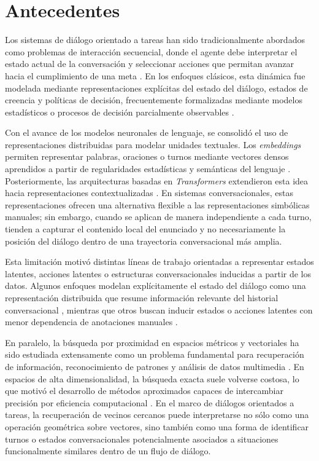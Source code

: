 \documentclass[runningheads]{llncs}
\begin{document}
\section{Antecedentes}
\label{sec:background}

Los sistemas de diálogo orientado a tareas han sido tradicionalmente abordados como problemas de interacción secuencial, donde el agente debe interpretar el estado actual de la conversación y seleccionar acciones que permitan avanzar hacia el cumplimiento de una meta \cite{young2013pomdp}. En los enfoques clásicos, esta dinámica fue modelada mediante representaciones explícitas del estado del diálogo, estados de creencia y políticas de decisión, frecuentemente formalizadas mediante modelos estadísticos o procesos de decisión parcialmente observables \cite{williams2013pomdp,chen2017survey}. 

Con el avance de los modelos neuronales de lenguaje, se consolidó el uso de representaciones distribuidas para modelar unidades textuales. Los \textit{embeddings} permiten representar palabras, oraciones o turnos mediante vectores densos aprendidos a partir de regularidades estadísticas y semánticas del lenguaje \cite{bengio2003neural,reimers2019sentencebert}. Posteriormente, las arquitecturas basadas en \textit{Transformers} extendieron esta idea hacia representaciones contextualizadas \cite{vaswani2017attention,devlin2019bert}. En sistemas conversacionales, estas representaciones ofrecen una alternativa flexible a las representaciones simbólicas manuales; sin embargo, cuando se aplican de manera independiente a cada turno, tienden a capturar el contenido local del enunciado y no necesariamente la posición del diálogo dentro de una trayectoria conversacional más amplia.

Esta limitación motivó distintas líneas de trabajo orientadas a representar estados latentes, acciones latentes o estructuras conversacionales inducidas a partir de los datos. Algunos enfoques modelan explícitamente el estado del diálogo como una representación distribuida que resume información relevante del historial conversacional \cite{wen2018sequence}, mientras que otros buscan inducir estados o acciones latentes con menor dependencia de anotaciones manuales \cite{min2020dialogue,hudecek2022latent,liu2023vls}.

En paralelo, la búsqueda por proximidad en espacios métricos y vectoriales ha sido estudiada extensamente como un problema fundamental para recuperación de información, reconocimiento de patrones y análisis de datos multimedia \cite{chavez2001searching}. En espacios de alta dimensionalidad, la búsqueda exacta suele volverse costosa, lo que motivó el desarrollo de métodos aproximados capaces de intercambiar precisión por eficiencia computacional \cite{chavez2005proximity}. En el marco de diálogos orientados a tareas, la recuperación de vecinos cercanos puede interpretarse no sólo como una operación geométrica sobre vectores, sino también como una forma de identificar turnos o estados conversacionales potencialmente asociados a situaciones funcionalmente similares dentro de un flujo de diálogo.
\end{document}
